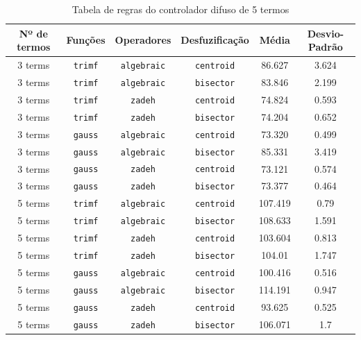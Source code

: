 \documentclass{article}
\begin{document}
\begin{table}[!h]
\centering
	\caption{Tabela de regras do controlador difuso de 5 termos}
	\label{results}
	\begin{tabular}{|c|c|c|c|c|c|}
		\hline 
		\textbf{Nº de termos} & \textbf{Funções} & \textbf{Operadores} & \textbf{Desfuzificação} & \textbf{Média} & \textbf{Desvio-Padrão} \\
		\hline
		3 terms & \texttt{trimf} & \texttt{algebraic} & \texttt{centroid} & 86.627 & 3.624 \\
		\hline
		3 terms & \texttt{trimf} & \texttt{algebraic} & \texttt{bisector} & 83.846 & 2.199 \\
		\hline
		3 terms & \texttt{trimf} & \texttt{zadeh} & \texttt{centroid} & 74.824 & 0.593 \\
		\hline
		3 terms & \texttt{trimf} & \texttt{zadeh} & \texttt{bisector} & 74.204 & 0.652 \\
		\hline
		3 terms & \texttt{gauss} & \texttt{algebraic} & \texttt{centroid} & 73.320 & 0.499 \\
		\hline
		3 terms & \texttt{gauss} & \texttt{algebraic} & \texttt{bisector} & 85.331 & 3.419 \\
		\hline
		3 terms & \texttt{gauss} & \texttt{zadeh} & \texttt{centroid} & 73.121 & 0.574 \\
		\hline
		3 terms & \texttt{gauss} & \texttt{zadeh} & \texttt{bisector} & 73.377 & 0.464 \\
		\hline
		5 terms & \texttt{trimf} & \texttt{algebraic} & \texttt{centroid} & 107.419 & 0.79 \\
		\hline
		5 terms & \texttt{trimf} & \texttt{algebraic} & \texttt{bisector} & 108.633 & 1.591 \\
		\hline
		5 terms & \texttt{trimf} & \texttt{zadeh} & \texttt{centroid} & 103.604 & 0.813 \\
		\hline
		5 terms & \texttt{trimf} & \texttt{zadeh} & \texttt{bisector} & 104.01 & 1.747 \\
		\hline
		5 terms & \texttt{gauss} & \texttt{algebraic} & \texttt{centroid} & 100.416 & 0.516 \\
		\hline
		5 terms & \texttt{gauss} & \texttt{algebraic} & \texttt{bisector} & 114.191 & 0.947 \\
		\hline
		5 terms & \texttt{gauss} & \texttt{zadeh} & \texttt{centroid} & 93.625 & 0.525 \\
		\hline
		5 terms & \texttt{gauss} & \texttt{zadeh} & \texttt{bisector} & 106.071 & 1.7 \\
		\hline
	\end{tabular} 
\end{table}
\end{document}
